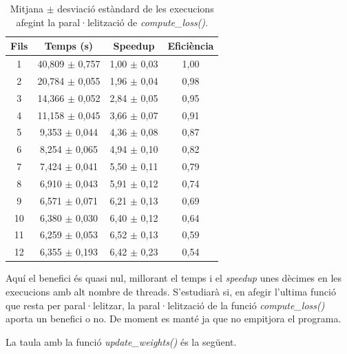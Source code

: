 \documentclass{article}
\begin{document}
\begin{table}[H]
\centering
\begin{tabular}{|c|c|c|c|}
\hline
\textbf{Fils} & \textbf{Temps (s)} & \textbf{Speedup} & \textbf{Eficiència} \\ \hline
1 & 40,809 $\pm$ 0,757 & 1,00 $\pm$ 0,03 & 1,00 \\ \hline
2 & 20,784 $\pm$ 0,055 & 1,96 $\pm$ 0,04 & 0,98 \\ \hline
3 & 14,366 $\pm$ 0,052 & 2,84 $\pm$ 0,05 & 0,95 \\ \hline
4 & 11,158 $\pm$ 0,045 & 3,66 $\pm$ 0,07 & 0,91 \\ \hline
5 & 9,353 $\pm$ 0,044 & 4,36 $\pm$ 0,08 & 0,87 \\ \hline
6 & 8,254 $\pm$ 0,065 & 4,94 $\pm$ 0,10 & 0,82 \\ \hline
7 & 7,424 $\pm$ 0,041 & 5,50 $\pm$ 0,11 & 0,79 \\ \hline
8 & 6,910 $\pm$ 0,043 & 5,91 $\pm$ 0,12 & 0,74 \\ \hline
9 & 6,571 $\pm$ 0,071 & 6,21 $\pm$ 0,13 & 0,69 \\ \hline
10 & 6,380 $\pm$ 0,030 & 6,40 $\pm$ 0,12 & 0,64 \\ \hline
11 & 6,259 $\pm$ 0,053 & 6,52 $\pm$ 0,13 & 0,59 \\ \hline
12 & 6,355 $\pm$ 0,193 & 6,42 $\pm$ 0,23 & 0,54 \\ \hline
\end{tabular}
\caption{Mitjana $\pm$ desviació estàndard de les execucions afegint la paral·lelització de \textit{compute\_loss()}.}
\label{tab:resultats7}
\end{table}

Aquí el benefici és quasi nul, millorant el temps  i el \textit{speedup} unes dècimes en les execucions amb alt nombre de threads. 
S'estudiarà si, en afegir l'ultima funció que resta per paral·lelitzar, la paral·lelització de la funció \textit{compute\_loss()} aporta un benefici o no. De moment es manté ja que no empitjora el programa.

La taula amb la funció \textit{update\_weights()} és la següent.
\end{document}
